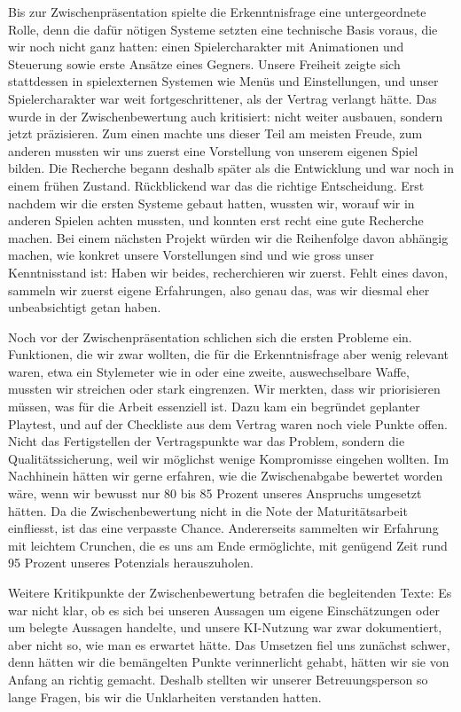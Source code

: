\documentclass[../Main.tex]{subfiles}
\begin{document}
Bis zur Zwischenpräsentation spielte die Erkenntnisfrage eine untergeordnete Rolle, denn die dafür nötigen Systeme setzten eine technische Basis voraus, die wir noch nicht ganz hatten: einen Spielercharakter mit Animationen und Steuerung sowie erste Ansätze eines Gegners. Unsere Freiheit zeigte sich stattdessen in spielexternen Systemen wie Menüs und Einstellungen, und unser Spielercharakter war weit fortgeschrittener, als der Vertrag verlangt hätte. Das wurde in der Zwischenbewertung auch kritisiert: nicht weiter ausbauen, sondern jetzt präzisieren. Zum einen machte uns dieser Teil am meisten Freude, zum anderen mussten wir uns zuerst eine Vorstellung von unserem eigenen Spiel bilden. Die Recherche begann deshalb später als die Entwicklung und war noch in einem frühen Zustand. Rückblickend war das die richtige Entscheidung. Erst nachdem wir die ersten Systeme gebaut hatten, wussten wir, worauf wir in anderen Spielen achten mussten, und konnten erst recht eine gute Recherche machen. Bei einem nächsten Projekt würden wir die Reihenfolge davon abhängig machen, wie konkret unsere Vorstellungen sind und wie gross unser Kenntnisstand ist: Haben wir beides, recherchieren wir zuerst. Fehlt eines davon, sammeln wir zuerst eigene Erfahrungen, also genau das, was wir diesmal eher unbeabsichtigt getan haben.

Noch vor der Zwischenpräsentation schlichen sich die ersten Probleme ein. Funktionen, die wir zwar wollten, die für die Erkenntnisfrage aber wenig relevant waren, etwa ein Stylemeter wie in \autocite{capcom_devilmaycry_2001} oder eine zweite, auswechselbare Waffe, mussten wir streichen oder stark eingrenzen. Wir merkten, dass wir priorisieren müssen, was für die Arbeit essenziell ist. Dazu kam ein begründet geplanter Playtest, und auf der Checkliste aus dem Vertrag waren noch viele Punkte offen. Nicht das Fertigstellen der Vertragspunkte war das Problem, sondern die Qualitätssicherung, weil wir möglichst wenige Kompromisse eingehen wollten. Im Nachhinein hätten wir gerne erfahren, wie die Zwischenabgabe bewertet worden wäre, wenn wir bewusst nur 80 bis 85 Prozent unseres Anspruchs umgesetzt hätten. Da die Zwischenbewertung nicht in die Note der Maturitätsarbeit einfliesst, ist das eine verpasste Chance. Andererseits sammelten wir Erfahrung mit leichtem Crunchen, die es uns am Ende ermöglichte, mit genügend Zeit rund 95 Prozent unseres Potenzials herauszuholen.

Weitere Kritikpunkte der Zwischenbewertung betrafen die begleitenden Texte: Es war nicht klar, ob es sich bei unseren Aussagen um eigene Einschätzungen oder um belegte Aussagen handelte, und unsere KI-Nutzung war zwar dokumentiert, aber nicht so, wie man es erwartet hätte. Das Umsetzen fiel uns zunächst schwer, denn hätten wir die bemängelten Punkte verinnerlicht gehabt, hätten wir sie von Anfang an richtig gemacht. Deshalb stellten wir unserer Betreuungsperson so lange Fragen, bis wir die Unklarheiten verstanden hatten.
\end{document}

